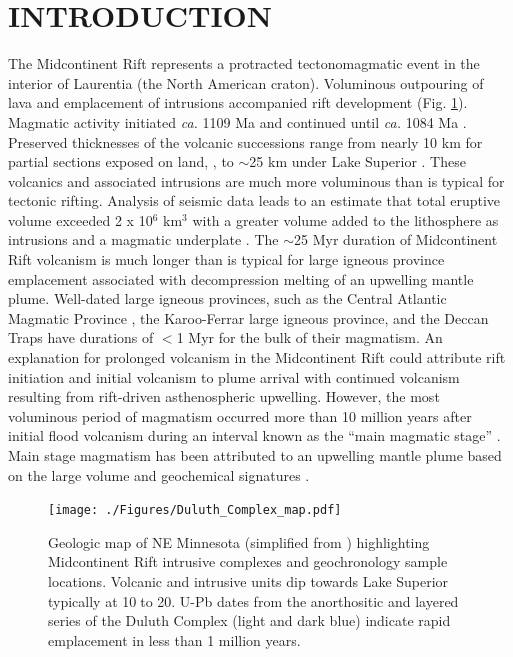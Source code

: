 \documentclass[11pt,letterpaper]{article}
\begin{document}
\section*{INTRODUCTION}

The Midcontinent Rift represents a protracted tectonomagmatic event in the interior of Laurentia (the North American craton). Voluminous outpouring of lava and emplacement of intrusions accompanied rift development (Fig. \ref{fig:map}). Magmatic activity initiated \textit{ca.} 1109 Ma and continued until \textit{ca.} 1084 Ma \citep{Swanson-Hysell2019a}. Preserved thicknesses of the volcanic successions range from nearly 10 km for partial sections exposed on land, \citep{Green2011a}, to $\sim$25 km under Lake Superior \citep{Cannon1992b}. These volcanics and associated intrusions are much more voluminous than is typical for tectonic rifting. Analysis of seismic data leads to an estimate that total eruptive volume exceeded 2 x 10$^6$ km$^3$ with a greater volume added to the lithosphere as intrusions and a magmatic underplate \citep{Cannon1992b}. The $\sim$25 Myr duration of Midcontinent Rift volcanism is much longer than is typical for large igneous province emplacement associated with decompression melting of an upwelling mantle plume. Well-dated large igneous provinces, such as the Central Atlantic Magmatic Province \citep{Blackburn2013a}, the Karoo-Ferrar large igneous province\citep{Burgess2015a}, and the Deccan Traps \citep{Schoene2019a, Sprain2019a} have durations of $<$1 Myr for the bulk of their magmatism. An explanation for prolonged volcanism in the Midcontinent Rift could attribute rift initiation and initial volcanism to plume arrival with continued volcanism resulting from rift-driven asthenospheric upwelling. However, the most voluminous period of magmatism occurred more than 10 million years after initial flood volcanism during an interval known as the ``main magmatic stage'' \citep{Vervoort2007a}. Main stage magmatism has been attributed to an upwelling mantle plume based on the large volume and geochemical signatures \citep{Nicholson1990a, White1995a}.

\begin{figure}[!ht]
\noindent\texttt{[image: ./Figures/Duluth\_Complex\_map.pdf]}
\centering
\caption{\small{Geologic map of NE Minnesota (simplified from \citealp{Jirsa2011a}) highlighting Midcontinent Rift intrusive complexes and geochronology sample locations. Volcanic and intrusive units dip towards Lake Superior typically at 10\textdegree$\;$to 20\textdegree. U-Pb dates from the anorthositic and layered series of the Duluth Complex (light and dark blue) indicate rapid emplacement in less than 1 million years.}}
\label{fig:map}
\end{figure}
\end{document}
